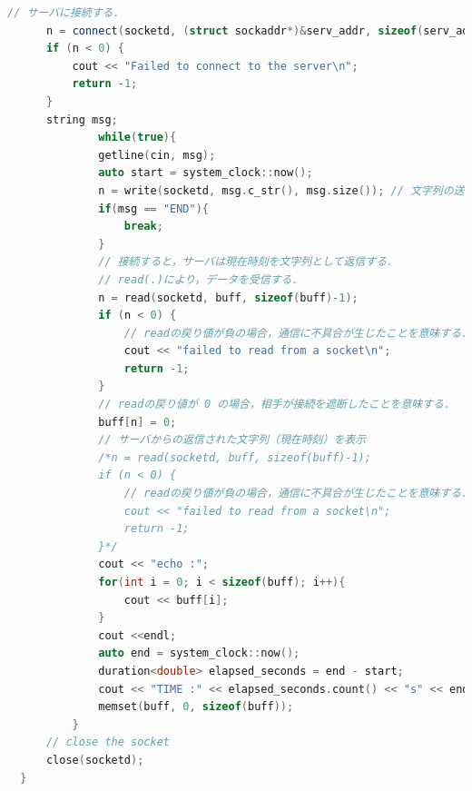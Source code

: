 \documentclass[fleqn, a4paper. 12pt]{ltjsarticle}
\begin{document}
\begin{lstlisting}[language=C++]
      // サーバに接続する．
      n = connect(socketd, (struct sockaddr*)&serv_addr, sizeof(serv_addr));
      if (n < 0) {
          cout << "Failed to connect to the server\n";
          return -1;
      }
      string msg;
              while(true){
              getline(cin, msg);
              auto start = system_clock::now();
              n = write(socketd, msg.c_str(), msg.size()); // 文字列の送信．第二引数は記憶域．第３引数は送信するByte数．
              if(msg == "END"){
                  break;
              }
              // 接続すると，サーバは現在時刻を文字列として返信する．
              // read(.)により，データを受信する．
              n = read(socketd, buff, sizeof(buff)-1);
              if (n < 0) {
                  // readの戻り値が負の場合，通信に不具合が生じたことを意味する．
                  cout << "failed to read from a socket\n";
                  return -1;
              }
              // readの戻り値が 0 の場合，相手が接続を遮断したことを意味する．
              buff[n] = 0;
              // サーバからの返信された文字列（現在時刻）を表示
              /*n = read(socketd, buff, sizeof(buff)-1);
              if (n < 0) {
                  // readの戻り値が負の場合，通信に不具合が生じたことを意味する．
                  cout << "failed to read from a socket\n";
                  return -1;
              }*/
              cout << "echo :";
              for(int i = 0; i < sizeof(buff); i++){
                  cout << buff[i];
              }
              cout <<endl;
              auto end = system_clock::now();
              duration<double> elapsed_seconds = end - start;
              cout << "TIME :" << elapsed_seconds.count() << "s" << endl;
              memset(buff, 0, sizeof(buff));
          }
      // close the socket
      close(socketd);
  }
  
\end{lstlisting}
\end{document}
